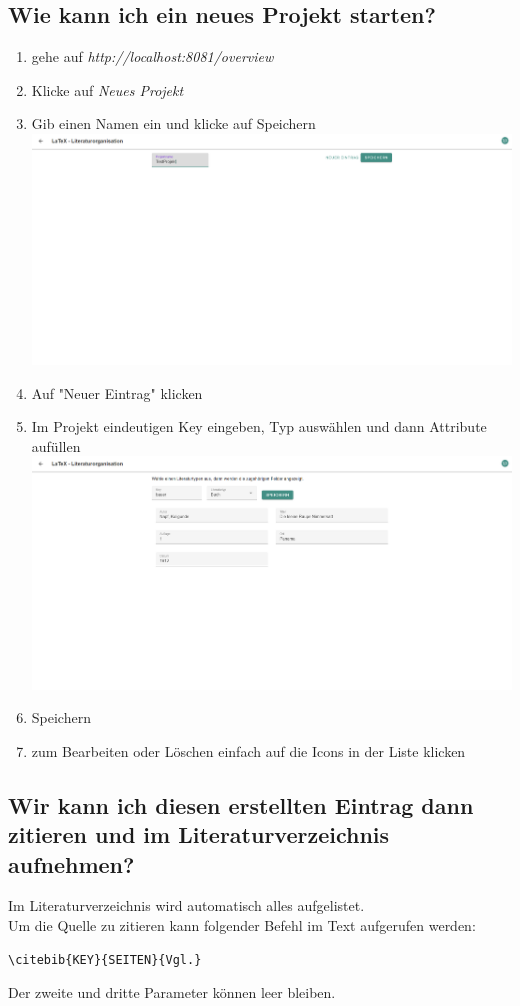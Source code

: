 \documentclass[12pt]{article}
\begin{document}
\subsection{Wie kann ich ein neues Projekt starten?}
\begin{enumerate}
\item gehe auf \textit{http://localhost:8081/overview}
\item Klicke auf \textit{Neues Projekt}
\item Gib einen Namen ein und klicke auf Speichern\newline
\includegraphics[width=\linewidth]{dokuImages/gui2_1.png}
\item Auf "Neuer Eintrag" klicken
\item Im Projekt eindeutigen Key eingeben, Typ auswählen und dann Attribute aufüllen\\
\includegraphics[width=\linewidth]{dokuImages/gui2_2.png}
\item Speichern
\item zum Bearbeiten oder Löschen einfach auf die Icons in der Liste klicken
\end{enumerate}

\subsection{Wir kann ich diesen erstellten Eintrag dann zitieren und im Literaturverzeichnis aufnehmen?}
Im Literaturverzeichnis wird automatisch alles aufgelistet.\\[6pt]Um die Quelle zu zitieren kann folgender Befehl im Text aufgerufen werden:
\begin{verbatim}
\citebib{KEY}{SEITEN}{Vgl.}
\end{verbatim}
Der zweite und dritte Parameter können leer bleiben.
\end{document}

